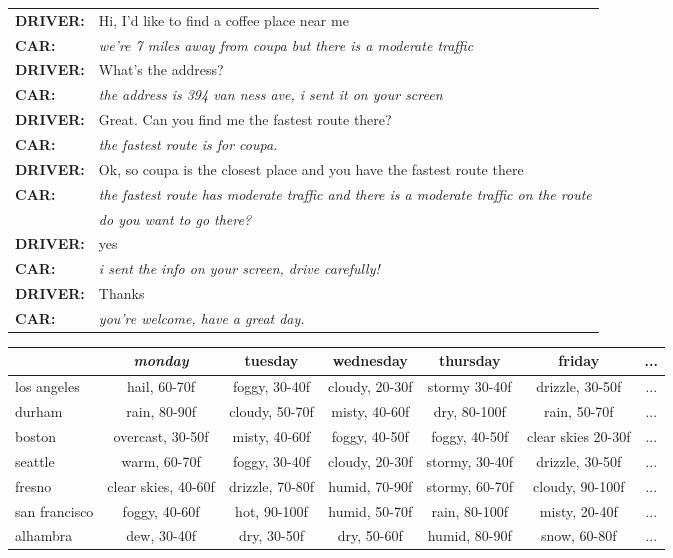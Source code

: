 \documentclass[11pt,a4paper]{article}
\begin{document}
\begin{figure*}
  \begin{tabular}{ll}
    \bf DRIVER: & Hi, I'd like to find a coffee place near me\\
    \bf CAR: & \emph{we're 7 miles away from coupa but there is a moderate traffic} \\
    \bf DRIVER: & What's the address?\\ 
    \bf CAR: & \emph{the address is 394 van ness ave, i sent it on your screen}\\
    \bf DRIVER: & Great. Can you find me the fastest route there?\\
    \bf CAR: & \emph{the fastest route is for coupa.}\\
    \bf DRIVER: & Ok, so coupa is the closest place and you have the fastest route there\\
    \bf CAR: & \emph{the fastest route has moderate traffic and there is a moderate traffic on the route}\\
    & \emph{do you want to go there?}\\
    \bf DRIVER: & yes \\
    \bf CAR: & \emph{i sent the info on your screen, drive carefully!} \\
    \bf DRIVER: & Thanks \\
    \bf CAR: & \emph{you're welcome, have a great day.}
  \end{tabular}

  \vspace{6mm}

  \small
\centering
  \begin{tabular}{|l|c|c|c|c|c|c|}
  \hline
  & \bf \emph{monday} & \bf tuesday & \bf wednesday & \bf thursday & \bf friday & ...\\ \hline
  los angeles& hail, 60-70f& foggy, 30-40f & cloudy, 20-30f & stormy 30-40f & drizzle, 30-50f & ...\\ 
  durham & rain, 80-90f & cloudy, 50-70f & misty, 40-60f & dry, 80-100f & rain, 50-70f & ...\\
  boston& overcast, 30-50f & misty, 40-60f & foggy, 40-50f & foggy, 40-50f & clear skies 20-30f & ...\\ 
  seattle & warm, 60-70f & foggy, 30-40f & cloudy, 20-30f & stormy, 30-40f & drizzle, 30-50f & ...\\ 
  fresno& clear skies, 40-60f & drizzle, 70-80f & humid, 70-90f & stormy, 60-70f & cloudy, 90-100f & ...\\
  san francisco & foggy, 40-60f & hot, 90-100f & humid, 50-70f & rain, 80-100f & misty, 20-40f & ...\\
  alhambra & dew, 30-40f & dry, 30-50f & dry, 50-60f & humid, 80-90f & snow, 60-80f & ...\\
  \hline
  \end{tabular}


\end{figure*}
\end{document}
